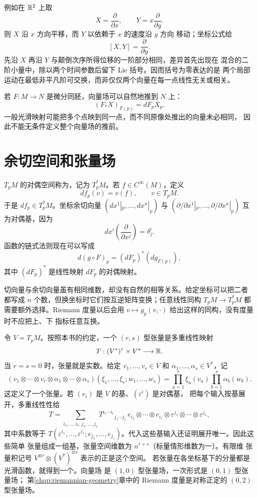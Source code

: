 例如在 \(\mathbb{R}^2\) 上取
\[
 X=\frac{\partial}{\partial x},\qquad
 Y=x\frac{\partial}{\partial y}.
\]
则 \(X\) 沿 \(x\) 方向平移，而 \(Y\) 以依赖于 \(x\) 的速度沿 \(y\) 方向
移动；坐标公式给
\[
 [X,Y]=\frac{\partial}{\partial y}.
\]
先沿 \(X\) 再沿 \(Y\) 与颠倒次序所得位移的一阶部分相同，差异首先出现在
混合的二阶小量中，除以两个时间参数后留下 Lie 括号。因而括号为零表达的是
两个局部运动在最低非平凡阶可交换，而非仅仅两个向量在每一点线性无关或相关。

若 \(F:M\to N\) 是微分同胚，向量场可以自然地推到 \(N\) 上：
\[
 (F_*X)_{F(p)}=dF_pX_p.
\]
一般光滑映射可能把多个点映到同一点，而不同原像处推出的向量未必相同，
因此不能无条件定义整个向量场的推前。

\section{余切空间和张量场}

\(T_pM\) 的对偶空间称为，记为 \(T_p^*M\)。若
\(f\in C^\infty(M)\)，定义
\[
 df_p(v)=v(f),\qquad v\in T_pM.
\]
于是 \(df_p\in T_p^*M\)。坐标余切向量
\((dx^1|_p,\ldots,dx^n|_p)\) 与
\((\partial/\partial x^1|_p,\ldots,\partial/\partial x^n|_p)\)
互为对偶基，因为
\[
 dx^i\left(\frac{\partial}{\partial x^j}\right)=\delta^i_j.
\]
函数的链式法则现在可以写成
\[
 d(g\circ F)_p=(dF_p)^*(dg_{F(p)}),
\]
其中 \((dF_p)^*\) 是线性映射 \(dF_p\) 的对偶映射。

切向量与余切向量虽有相同维数，却没有自然的相等关系。给定坐标可以把二者
都写成 \(n\) 个数，但换坐标时它们按互逆矩阵变换；任意线性同构
\(T_pM\to T_p^*M\) 都需要额外选择。Riemann 度量以后会用
\(v\mapsto g_p(v,\mathord\cdot)\) 给出这样的同构，没有度量时不应把上、下
指标任意互换。

令 $V=T_pM$。按照本书的约定，一个 $(r,s)$ 型张量是多重线性映射
\[
 T:(V^*)^r\times V^s\longrightarrow\mathbb{R}.
\]
当 $r=s=0$ 时，张量就是实数。给定 $v_1,\ldots,v_r\in V$ 和
$\alpha_1,\ldots,\alpha_s\in V^*$，记
\[
 (v_1\otimes\cdots\otimes v_r\otimes\alpha_1\otimes\cdots\otimes\alpha_s)
 (\xi_1,\ldots,\xi_r;w_1,\ldots,w_s)
 =\prod_{a=1}^r\xi_a(v_a)\prod_{b=1}^s\alpha_b(w_b).
\]
这定义了一个张量。若 $(e_i)$ 是 $V$ 的基、$(\varepsilon^i)$ 是对偶基，
把每个输入按基展开，多重线性性给
\[
 T=\sum_{i_1,\ldots,i_r,j_1,\ldots,j_s}
 T^{i_1\cdots i_r}{}_{j_1\cdots j_s}\,
 e_{i_1}\otimes\cdots\otimes e_{i_r}
 \otimes\varepsilon^{j_1}\otimes\cdots\otimes\varepsilon^{j_s},
\]
其中系数等于 $T(\varepsilon^{i_1},\ldots,\varepsilon^{i_r};
e_{j_1},\ldots,e_{j_s})$。代入这些基输入还证明展开唯一。因此这些简单
张量组成一组基，张量空间维数为 $n^{r+s}$（标量情形维数为一）。有限维
张量积记号 $V^{\otimes r}\otimes(V^*)^{\otimes s}$ 表示的正是这个空间。
若张量在各坐标基下的分量都是光滑函数，就得到一个。向量场
是 \((1,0)\) 型张量场，一次形式是 \((0,1)\) 型张量场；
第\ref{chap:riemannian-geometry}章中的
Riemann 度量是对称正定的 \((0,2)\) 型张量场。

